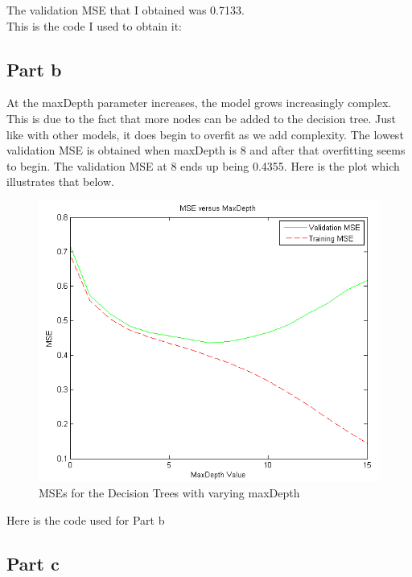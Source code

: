 \documentclass[twoside,11pt]{article}
\theoremstyle{definition}
\begin{document}
The validation MSE that I obtained was 0.7133. \\
This is the code I used to obtain it:


\newpage

\subsection*{Part b}

At the maxDepth parameter increases, the model grows increasingly complex. This is due to the fact that more nodes can be added to the decision tree. Just like with other models, it does begin to overfit as we add complexity. The lowest validation MSE is obtained when maxDepth is 8 and after that overfitting seems to begin. The validation MSE at 8 ends up being 0.4355. Here is the plot which illustrates that below.

\begin{figure}[h]
\centering
\includegraphics[width=6 in]{prob3plot1.png}
\caption{MSEs for the Decision Trees with varying maxDepth}
\end{figure}

\newpage

Here is the code used for Part b\\


\newpage

\subsection*{Part c}
\end{document}
